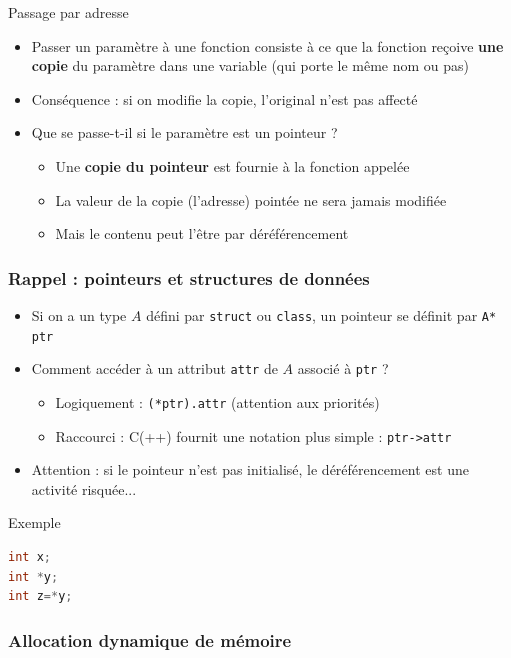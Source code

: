 \begin{frame}{Passage par adresse}
\begin{itemize}
\item Passer un paramètre à une fonction consiste à ce que la fonction reçoive \textbf{une copie} du paramètre dans une variable (qui porte le même nom ou pas)
\item Conséquence : si on modifie la copie, l'original n'est pas affecté
\item Que se passe-t-il si le paramètre est un pointeur ?
\begin{itemize}
\item Une \textbf{copie du pointeur} est fournie à la fonction appelée
\item La valeur de la copie (l'adresse) pointée ne sera jamais modifiée
\item Mais le contenu peut l'être par déréférencement
\end{itemize}
\end{itemize}
\end{frame}

\begin{frame}[fragile]
\frametitle{Rappel : pointeurs et structures de données}
\begin{itemize}
\item Si on a un type $A$ défini par \texttt{struct} ou \texttt{class}, un pointeur se définit par \texttt{A* ptr}
\item Comment accéder à un attribut \texttt{attr} de $A$ associé à \texttt{ptr} ?
\begin{itemize}
\item Logiquement : \texttt{(*ptr).attr} (attention aux priorités)
\item Raccourci : C(++) fournit une notation plus simple : \texttt{ptr->attr}
\end{itemize}
\item Attention : si le pointeur n'est pas initialisé, le déréférencement est une activité risquée...
\end{itemize}
\begin{exampleblock}{Exemple}
\begin{lstlisting}[language=C++]
int x;
int *y;
int z=*y;
\end{lstlisting}
\end{exampleblock}
\end{frame}

\subsubsection{Allocation dynamique de mémoire}

